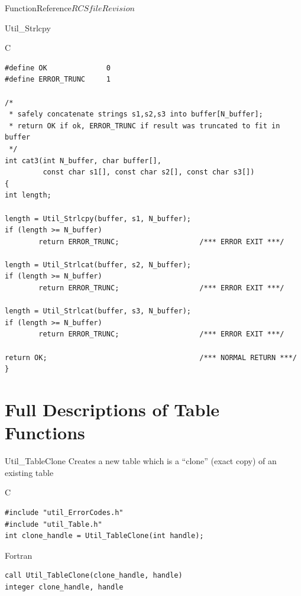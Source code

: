 \begin{cactuspart}{FunctionReference}{$RCSfile$}{$Revision$}
\begin{FunctionDescription}{Util\_Strlcpy}
\begin{ExampleSection}
\begin{Example}{C}
\begin{verbatim}
#define OK              0
#define ERROR_TRUNC     1

/*
 * safely concatenate strings s1,s2,s3 into buffer[N_buffer];
 * return OK if ok, ERROR_TRUNC if result was truncated to fit in buffer
 */
int cat3(int N_buffer, char buffer[],
         const char s1[], const char s2[], const char s3[])
{
int length;

length = Util_Strlcpy(buffer, s1, N_buffer);
if (length >= N_buffer)
        return ERROR_TRUNC;                   /*** ERROR EXIT ***/

length = Util_Strlcat(buffer, s2, N_buffer);
if (length >= N_buffer)
        return ERROR_TRUNC;                   /*** ERROR EXIT ***/

length = Util_Strlcat(buffer, s3, N_buffer);
if (length >= N_buffer)
        return ERROR_TRUNC;                   /*** ERROR EXIT ***/

return OK;                                    /*** NORMAL RETURN ***/
}
\end{verbatim}
\end{Example}
\end{ExampleSection}
\end{FunctionDescription}


\section{Full Descriptions of Table Functions}


\begin{FunctionDescription}{Util\_TableClone}
\label{Util-TableClone}
Creates a new table which is a ``clone'' (exact copy) of an existing
table

\begin{SynopsisSection}
\begin{Synopsis}{C}
\begin{verbatim}
#include "util_ErrorCodes.h"
#include "util_Table.h"
int clone_handle = Util_TableClone(int handle);
\end{verbatim}
\end{Synopsis}
\begin{Synopsis}{Fortran}
\begin{verbatim}
call Util_TableClone(clone_handle, handle)
integer clone_handle, handle
\end{verbatim}
\end{Synopsis}
\end{SynopsisSection}


\end{FunctionDescription}
\end{cactuspart}
